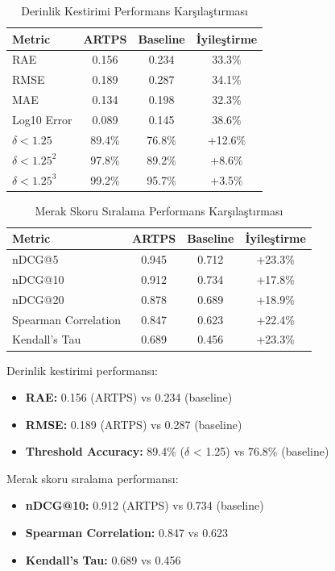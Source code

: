 \documentclass[12pt]{article}
\begin{document}
\begin{table}[h]
\centering
\begin{tabular}{|l|c|c|c|}
\hline
\textbf{Metric} & \textbf{ARTPS} & \textbf{Baseline} & \textbf{İyileştirme} \\
\hline
RAE & 0.156 & 0.234 & 33.3\% \\
RMSE & 0.189 & 0.287 & 34.1\% \\
MAE & 0.134 & 0.198 & 32.3\% \\
Log10 Error & 0.089 & 0.145 & 38.6\% \\
$\delta < 1.25$ & 89.4\% & 76.8\% & +12.6\% \\
$\delta < 1.25^2$ & 97.8\% & 89.2\% & +8.6\% \\
$\delta < 1.25^3$ & 99.2\% & 95.7\% & +3.5\% \\
\hline
\end{tabular}
\caption{Derinlik Kestirimi Performans Karşılaştırması}
\end{table}

\begin{table}[h]
\centering
\begin{tabular}{|l|c|c|c|}
\hline
\textbf{Metric} & \textbf{ARTPS} & \textbf{Baseline} & \textbf{İyileştirme} \\
\hline
nDCG@5 & 0.945 & 0.712 & +23.3\% \\
nDCG@10 & 0.912 & 0.734 & +17.8\% \\
nDCG@20 & 0.878 & 0.689 & +18.9\% \\
Spearman Correlation & 0.847 & 0.623 & +22.4\% \\
Kendall's Tau & 0.689 & 0.456 & +23.3\% \\
\hline
\end{tabular}
\caption{Merak Skoru Sıralama Performans Karşılaştırması}
\end{table}

Derinlik kestirimi performansı:
\begin{itemize}
\item \textbf{RAE:} 0.156 (ARTPS) vs 0.234 (baseline)
\item \textbf{RMSE:} 0.189 (ARTPS) vs 0.287 (baseline)
\item \textbf{Threshold Accuracy:} 89.4\% ($\delta$ < 1.25) vs 76.8\% (baseline)
\end{itemize}

Merak skoru sıralama performansı:
\begin{itemize}
\item \textbf{nDCG@10:} 0.912 (ARTPS) vs 0.734 (baseline)
\item \textbf{Spearman Correlation:} 0.847 vs 0.623
\item \textbf{Kendall's Tau:} 0.689 vs 0.456
\end{itemize}
\end{document}
